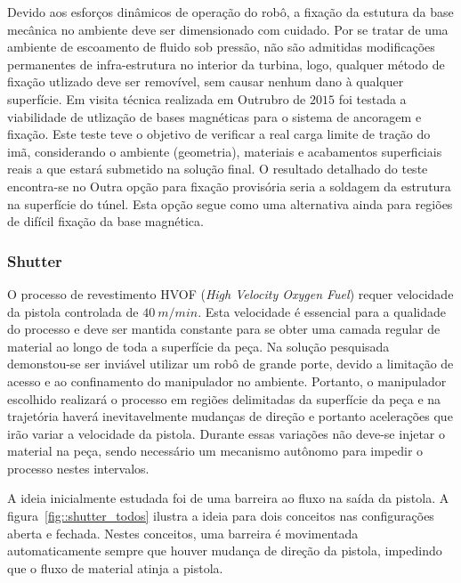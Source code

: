 Devido aos esforços dinâmicos de operação do robô, a fixação da estutura da
base mecânica no ambiente deve ser dimensionado com cuidado. Por se
tratar de uma ambiente de escoamento de fluido sob pressão, não são admitidas
modificações permanentes de infra-estrutura no interior da turbina, logo,
qualquer método de fixação utlizado deve ser removível, sem causar nenhum dano
à qualquer superfície. Em visita técnica realizada em Outrubro de $2015$ foi
testada a viabilidade de utlização de bases magnéticas para o sistema de
ancoragem e fixação. Este teste teve o objetivo de verificar a real carga limite de tração
do imã, considerando o ambiente (geometria), materiais e acabamentos
superficiais reais a que estará submetido na solução final. O resultado
detalhado do teste encontra-se no
Outra opção para fixação provisória seria a soldagem da estrutura na
superfície do túnel. Esta opção segue como uma alternativa ainda para regiões
de difícil fixação da base magnética.
  
\subsubsection{Shutter}%
O processo de revestimento HVOF (\textit{High Velocity Oxygen Fuel}) requer
velocidade da pistola controlada de $40~m/min$. Esta velocidade é essencial para
a qualidade do processo e deve ser mantida constante para se obter uma camada 
regular de material ao longo de toda a superfície da peça. Na solução
pesquisada demonstou-se ser inviável utilizar um robô de grande porte, devido a
limitação de acesso e ao confinamento do manipulador no ambiente. Portanto, o
manipulador  escolhido realizará o processo em regiões delimitadas da
superfície da peça e na trajetória haverá inevitavelmente mudanças de direção e
portanto acelerações que irão variar a velocidade da pistola. Durante essas
variações não deve-se injetar o material na peça, sendo necessário um mecanismo
autônomo para impedir o processo nestes intervalos.

A ideia inicialmente estudada foi de uma barreira ao fluxo na saída da pistola. 
A figura~\ref{fig::shutter_todos} ilustra a ideia para dois conceitos nas
configurações aberta e fechada. 
Nestes conceitos, uma barreira é movimentada automaticamente sempre que houver
mudança de direção da pistola, impedindo que o fluxo de material atinja a
pistola. 

